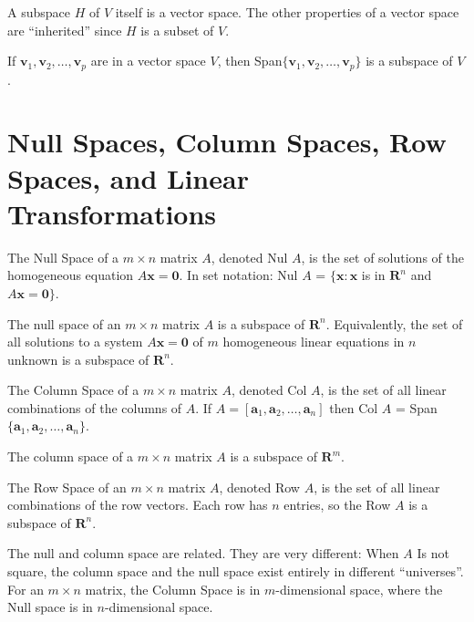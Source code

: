 \documentclass[../linalg.tex]{subfiles}
\begin{document}
A subspace $H$ of $V$ itself is a vector space. The other properties of a vector space are ``inherited'' since $H$ is a subset of $V$.

\begin{theorem}
    If $\textbf{v}_1,\textbf{v}_2,\dots,\textbf{v}_p$ are in a vector space $V$, then Span$\{\textbf{v}_1,\textbf{v}_2,\dots,\textbf{v}_p\}$ is a subspace of $V$.
\end{theorem}

\section{Null Spaces, Column Spaces, Row Spaces, and Linear Transformations}
The Null Space of a $m\times n$ matrix $A$, denoted Nul $A$, is the set of solutions of the homogeneous equation $A\textbf{x}=\textbf{0}$. In set notation: Nul $A$ = $\{\textbf{x}:\textbf{x}$ is in $\textbf{R}^n$ and $A\textbf{x}=\textbf{0}\}$.
\begin{theorem}
    The null space of an $m\times n$ matrix $A$ is a subspace of $\textbf{R}^n$. Equivalently, the set of all solutions to a system $A\textbf{x}=\textbf{0}$ of $m$ homogeneous linear equations in $n$ unknown is a subspace of $\textbf{R}^n$.
\end{theorem}

The Column Space of a $m\times n$ matrix $A$, denoted Col $A$, is the set of all linear combinations of the columns of $A$. If $A=[\textbf{a}_1,\textbf{a}_2,\dots, \textbf{a}_n]$ then Col $A$ = Span$\{\textbf{a}_1,\textbf{a}_2,\dots,\textbf{a}_n\}$.

\begin{theorem}
    The column space of a $m\times n$ matrix $A$ is a subspace of $\textbf{R}^m$.
\end{theorem}

The Row Space of an $m\times n$ matrix $A$, denoted Row $A$, is the set of all linear combinations of the row vectors. Each row has $n$ entries, so the Row $A$ is a subspace of $\textbf{R}^n$.

The null and column space are related. They are very different: When $A$ Is not square, the column space and the null space exist entirely in different ``universes''. For an $m\times n$ matrix, the Column Space is in $m$-dimensional space, where the Null space is in $n$-dimensional space.
\end{document}
